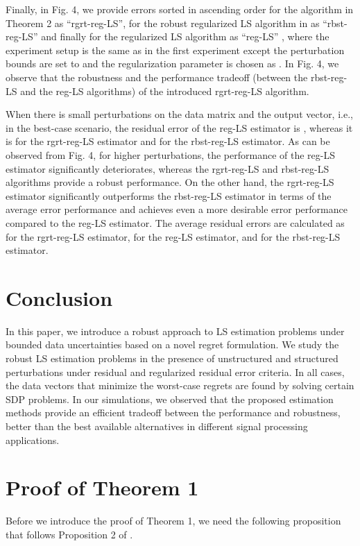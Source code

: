 \documentclass[review,sort&compress]{elsarticle}
\begin{document}
Finally, in Fig. 4, we provide errors sorted in ascending order for the algorithm in Theorem 2 as ``rgrt-reg-LS'', for the robust regularized LS algorithm in \cite{sayed02} as ``rbst-reg-LS'' and finally for the regularized LS algorithm as ``reg-LS'' \cite{Kailath:book}, where the experiment setup is the same as in the first experiment except the perturbation bounds are set to  and the regularization parameter is chosen as . In Fig. 4, we observe that the robustness and the performance tradeoff (between the rbst-reg-LS and the reg-LS algorithms) of the introduced rgrt-reg-LS algorithm.

When there is small perturbations on the data matrix and the output vector, i.e., in the best-case scenario, the residual error of the reg-LS estimator is , whereas it is  for the rgrt-reg-LS estimator and  for the rbst-reg-LS estimator. As can be observed from Fig. 4, for higher perturbations, the performance of the reg-LS estimator significantly deteriorates, whereas the rgrt-reg-LS and rbst-reg-LS algorithms provide a robust performance. On the other hand, the rgrt-reg-LS estimator significantly outperforms the rbst-reg-LS estimator in terms of the average error performance and achieves even a more desirable error performance compared to the reg-LS estimator. The average residual errors are calculated as  for the rgrt-reg-LS estimator,  for the reg-LS estimator, and  for the rbst-reg-LS estimator.

\section{Conclusion}\label{sec:conc}
In this paper, we introduce a robust approach to LS estimation problems under bounded data uncertainties based on a novel regret formulation. We study the robust LS estimation problems in the presence of unstructured and structured perturbations under residual and regularized residual error criteria. In all cases, the data vectors that minimize the worst-case regrets are found by solving certain SDP problems. In our simulations, we observed that the proposed estimation methods provide an efficient tradeoff between the performance and robustness, better than the best available alternatives in different signal processing applications.

\appendix
\section{Proof of Theorem 1}\label{app:pot1}
Before we introduce the proof of Theorem 1, we need the following proposition that follows Proposition 2 of \cite{yonina1}.
\end{document}
